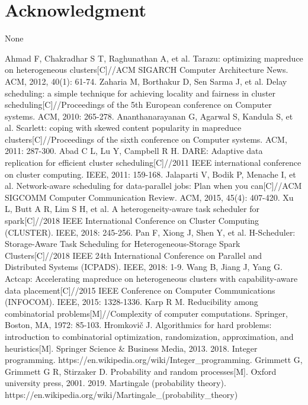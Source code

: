 \documentclass[conference]{IEEEtran}
\begin{document}
\section*{Acknowledgment}
None





\begin{thebibliography}{00}
 Ahmad F, Chakradhar S T, Raghunathan A, et al. Tarazu: optimizing mapreduce on heterogeneous clusters[C]//ACM SIGARCH Computer Architecture News. ACM, 2012, 40(1): 61-74.
 Zaharia M, Borthakur D, Sen Sarma J, et al. Delay scheduling: a simple technique for achieving locality and fairness in cluster scheduling[C]//Proceedings of the 5th European conference on Computer systems. ACM, 2010: 265-278.
 Ananthanarayanan G, Agarwal S, Kandula S, et al. Scarlett: coping with skewed content popularity in mapreduce clusters[C]//Proceedings of the sixth conference on Computer systems. ACM, 2011: 287-300.
 Abad C L, Lu Y, Campbell R H. DARE: Adaptive data replication for efficient cluster scheduling[C]//2011 IEEE international conference on cluster computing. IEEE, 2011: 159-168.
 Jalaparti V, Bodik P, Menache I, et al. Network-aware scheduling for data-parallel jobs: Plan when you can[C]//ACM SIGCOMM Computer Communication Review. ACM, 2015, 45(4): 407-420.
 Xu L, Butt A R, Lim S H, et al. A heterogeneity-aware task scheduler for spark[C]//2018 IEEE International Conference on Cluster Computing (CLUSTER). IEEE, 2018: 245-256.
 Pan F, Xiong J, Shen Y, et al. H-Scheduler: Storage-Aware Task Scheduling for Heterogeneous-Storage Spark Clusters[C]//2018 IEEE 24th International Conference on Parallel and Distributed Systems (ICPADS). IEEE, 2018: 1-9.
 Wang B, Jiang J, Yang G. Actcap: Accelerating mapreduce on heterogeneous clusters with capability-aware data placement[C]//2015 IEEE Conference on Computer Communications (INFOCOM). IEEE, 2015: 1328-1336.
 Karp R M. Reducibility among combinatorial problems[M]//Complexity of computer computations. Springer, Boston, MA, 1972: 85-103.
 Hromkovič J. Algorithmics for hard problems: introduction to combinatorial optimization, randomization, approximation, and heuristics[M]. Springer Science \& Business Media, 2013.
 2018. Integer programming. https://en.wikipedia.org/wiki/Integer\_programming.
 Grimmett G, Grimmett G R, Stirzaker D. Probability and random processes[M]. Oxford university press, 2001.
 2019. Martingale (probability theory). https://en.wikipedia.org/wiki/Martingale\_(probability\_theory)


\end{thebibliography}
\end{document}
